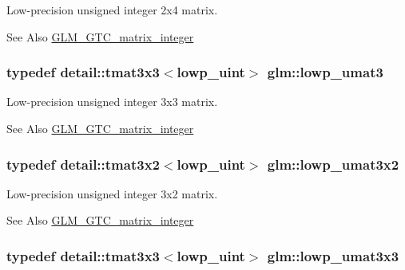 Low-\/precision unsigned integer 2x4 matrix. 

\begin{DoxySeeAlso}{See Also}
\hyperlink{group__gtc__matrix__integer}{G\-L\-M\-\_\-\-G\-T\-C\-\_\-matrix\-\_\-integer} 
\end{DoxySeeAlso}
\hypertarget{group__gtc__matrix__integer_ga9a4fea23f614c09bd4f69300849e53b8}{
\subsubsection[{lowp\-\_\-umat3}]{\setlength{\rightskip}{0pt plus 5cm}typedef detail\-::tmat3x3$<$lowp\-\_\-uint$>$ {\bf glm\-::lowp\-\_\-umat3}}}\label{group__gtc__matrix__integer_ga9a4fea23f614c09bd4f69300849e53b8}


Low-\/precision unsigned integer 3x3 matrix. 

\begin{DoxySeeAlso}{See Also}
\hyperlink{group__gtc__matrix__integer}{G\-L\-M\-\_\-\-G\-T\-C\-\_\-matrix\-\_\-integer} 
\end{DoxySeeAlso}
\hypertarget{group__gtc__matrix__integer_gab06e14a13476419d7e8c2421fc7f60a1}{
\subsubsection[{lowp\-\_\-umat3x2}]{\setlength{\rightskip}{0pt plus 5cm}typedef detail\-::tmat3x2$<$lowp\-\_\-uint$>$ {\bf glm\-::lowp\-\_\-umat3x2}}}\label{group__gtc__matrix__integer_gab06e14a13476419d7e8c2421fc7f60a1}


Low-\/precision unsigned integer 3x2 matrix. 

\begin{DoxySeeAlso}{See Also}
\hyperlink{group__gtc__matrix__integer}{G\-L\-M\-\_\-\-G\-T\-C\-\_\-matrix\-\_\-integer} 
\end{DoxySeeAlso}
\hypertarget{group__gtc__matrix__integer_ga228d53c61d9ebac283e8f76754c6cff1}{
\subsubsection[{lowp\-\_\-umat3x3}]{\setlength{\rightskip}{0pt plus 5cm}typedef detail\-::tmat3x3$<$lowp\-\_\-uint$>$ {\bf glm\-::lowp\-\_\-umat3x3}}}\label{group__gtc__matrix__integer_ga228d53c61d9ebac283e8f76754c6cff1}


